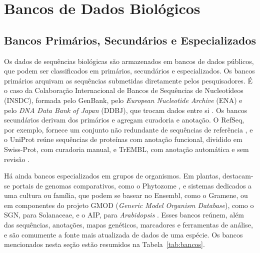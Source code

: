 \section{Bancos de Dados Biológicos}

\subsection{Bancos Primários, Secundários e Especializados}

Os dados de sequências biológicas são armazenados em bancos de dados públicos, que podem ser classificados em primários, secundários e especializados. Os bancos primários arquivam as sequências submetidas diretamente pelos pesquisadores. É o caso da Colaboração Internacional de Bancos de Sequências de Nucleotídeos (INSDC), formada pelo GenBank, pelo \textit{European Nucleotide Archive} (ENA) e pelo \textit{DNA Data Bank of Japan} (DDBJ), que trocam dados entre si \cite{Arita2021, Sayers2024}. Os bancos secundários derivam dos primários e agregam curadoria e anotação. O RefSeq, por exemplo, fornece um conjunto não redundante de sequências de referência \cite{OLeary2016}, e o UniProt reúne sequências de proteínas com anotação funcional, dividido em Swiss-Prot, com curadoria manual, e TrEMBL, com anotação automática e sem revisão \cite{UniProt2023}.

Há ainda bancos especializados em grupos de organismos. Em plantas, destacam-se portais de genomas comparativos, como o Phytozome \cite{Goodstein2012}, e sistemas dedicados a uma cultura ou família, que podem se basear no Ensembl, como o Gramene, ou em componentes do projeto GMOD (\textit{Generic Model Organism Database}), como o SGN, para Solanaceae, e o AIP, para \textit{Arabidopsis} \cite{Dereeper2015}. Esses bancos reúnem, além das sequências, anotações, mapas genéticos, marcadores e ferramentas de análise, e são comumente a fonte mais atualizada de dados de uma espécie. Os bancos mencionados nesta seção estão resumidos na Tabela~\ref{tab:bancos}.

